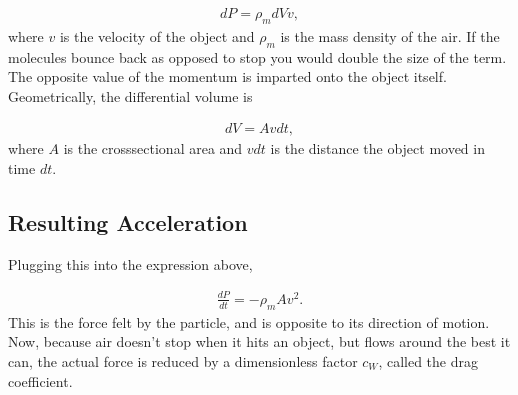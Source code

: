 \documentclass[letterpaper,10pt,english]{sphinxmanual}
\begin{document}
\begin{equation*}
\begin{split}
\begin{equation}
dP=\rho_m dV v,
\label{_auto1} \tag{1}
\end{equation}
\end{split}
\end{equation*}
where \(v\) is the velocity of the object and \(\rho_m\) is the mass
density of the air. If the molecules bounce back as opposed to stop
you would double the size of the term. The opposite value of the
momentum is imparted onto the object itself. Geometrically, the
differential volume is




\begin{equation*}
\begin{split}
\begin{equation}
dV=Avdt,
\label{_auto2} \tag{2}
\end{equation}
\end{split}
\end{equation*}
where \(A\) is the cross\sphinxhyphen{}sectional area and \(vdt\) is the distance the
object moved in time \(dt\).


\subsection{Resulting Acceleration}
\label{\detokenize{chapter2:resulting-acceleration}}
Plugging this into the expression above,




\begin{equation*}
\begin{split}
\begin{equation}
\frac{dP}{dt}=-\rho_m A v^2.
\label{_auto3} \tag{3}
\end{equation}
\end{split}
\end{equation*}
This is the force felt by the particle, and is opposite to its
direction of motion. Now, because air doesn’t stop when it hits an
object, but flows around the best it can, the actual force is reduced
by a dimensionless factor \(c_W\), called the drag coefficient.
\end{document}
